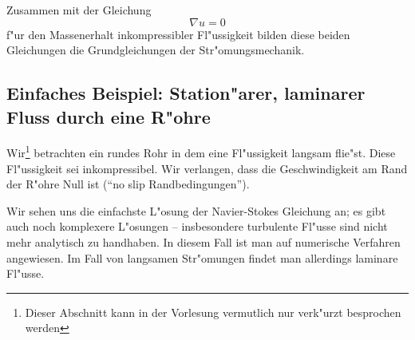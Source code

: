 Zusammen mit der Gleichung
$$ \nabla u=0$$
f"ur den Massenerhalt inkompressibler Fl"ussigkeit bilden diese beiden Gleichungen 
die Grundgleichungen der Str"omungsmechanik.

\subsection{Einfaches Beispiel: Station"arer, laminarer Fluss durch eine  R"ohre}
Wir\footnote{Dieser Abschnitt kann in der Vorlesung vermutlich nur verk"urzt besprochen werden} betrachten ein rundes Rohr in dem eine Fl"ussigkeit langsam flie"st. 
Diese Fl"ussigkeit sei inkompressibel. Wir verlangen, dass die Geschwindigkeit
am Rand der R"ohre Null ist (``no slip Randbedingungen''). \par

Wir sehen uns die einfachste L"osung
der Navier-Stokes Gleichung an; es gibt auch noch komplexere L"osungen -- 
insbesondere turbulente Fl"usse sind nicht mehr analytisch zu handhaben. 
In diesem Fall ist man auf numerische Verfahren angewiesen. Im Fall von langsamen 
Str"omungen findet man allerdings laminare Fl"usse. 

